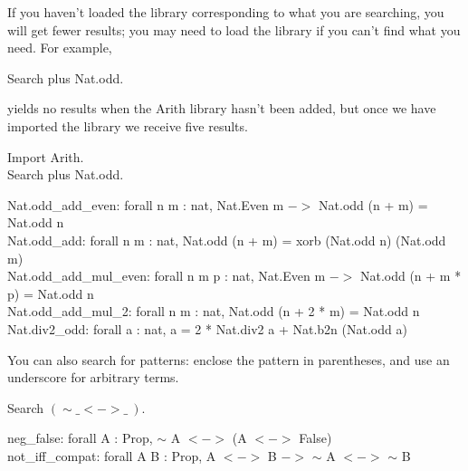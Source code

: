 \noindent 
If you haven't loaded the library corresponding to what you are searching, you will get fewer results; you may need to load the library if you can't find what you need. For example,
\begin{code}
	Search plus Nat.odd.
\end{code}
yields no results when the Arith library hasn't been added, but once we have imported the library we receive five results.
\begin{code}
	 Import Arith. 	\\
	Search plus Nat.odd.
\end{code}
\begin{msg}
	Nat.odd\_add\_even: forall n m : nat, Nat.Even m $->$ Nat.odd (n + m) = Nat.odd n	\\
	Nat.odd\_add: forall n m : nat, Nat.odd (n + m) = xorb (Nat.odd n) (Nat.odd m)		\\
	Nat.odd\_add\_mul\_even: forall n m p : nat, Nat.Even m $->$ Nat.odd (n + m * p) = Nat.odd n	\\
	Nat.odd\_add\_mul\_2: forall n m : nat, Nat.odd (n + 2 * m) = Nat.odd n	\\
	Nat.div2\_odd: forall a : nat, a = 2 * Nat.div2 a + Nat.b2n (Nat.odd a)
\end{msg}

\noindent
You can also search for patterns: enclose the pattern in parentheses, and use an underscore for arbitrary terms.
\begin{code}
	Search $(\sim \_ <-> \_\ )$.
\end{code}
\begin{msg}
	neg\_false: forall A : Prop, $\sim$ A $<->$ (A $<->$ False)		\\
	not\_iff\_compat: forall A B : Prop, A $<->$ B $->$ $\sim$ A $<->$ $\sim$ B
\end{msg}




